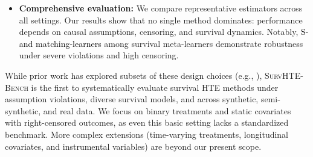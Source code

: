 \documentclass{article} %
\begin{document}
\begin{itemize}[leftmargin=*,itemsep=0pt,parsep=0pt,partopsep=0pt,topsep=-3pt]
    \item \textbf{Comprehensive evaluation:} We compare representative estimators across all settings. Our results show that no single method dominates: performance depends on causal assumptions, censoring, and survival dynamics. Notably, \textcolor{black}{S- and matching-learners} among survival meta-learners demonstrate robustness under severe violations and high censoring.
\end{itemize}

While prior work has explored subsets of these design choices (e.g., \citet{cui2023estimating, meir2025heterogeneous}), \mbox{\textsc{SurvHTE-Bench}} is the first to systematically evaluate survival HTE methods under assumption violations, diverse survival models, and across synthetic, semi-synthetic, and real data.
We focus on binary treatments and static covariates with right-censored outcomes, as even this basic setting lacks a standardized benchmark. More complex extensions (time-varying treatments, longitudinal covariates, and instrumental variables) are beyond our present scope. 
\end{document}
